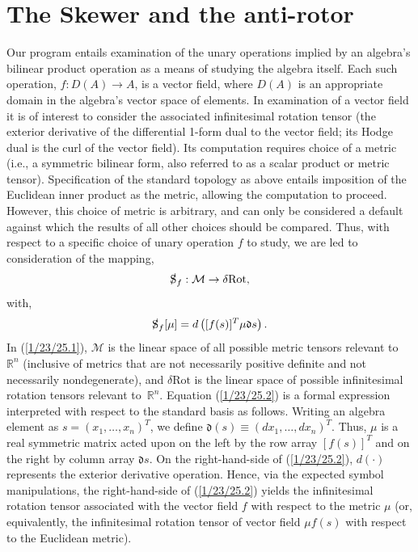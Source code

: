 \documentclass{amsart}
\numberwithin{equation}{section}
\theoremstyle{definition}
\numberwithin{theorem}{section}
\begin{document}
\section{The Skewer and the anti-rotor} 
Our program entails examination of the unary operations implied by an algebra's bilinear product operation as a means of studying the algebra itself.
Each such operation, $f:D(A)\rightarrow A$, is a vector field, where $D(A)$ is an appropriate domain in the algebra's vector space of elements.  In examination of a vector field it is of interest to consider the associated infinitesimal rotation tensor (the exterior derivative of the differential 1-form dual to the vector field; its Hodge dual is the curl of the vector field).  Its computation requires choice of a metric (i.e., a symmetric bilinear form, also referred to as a scalar product or metric tensor).  Specification of the standard topology as above entails imposition of the Euclidean inner product as the metric, allowing the computation to proceed.  However, this choice of metric is arbitrary, and can only be considered a default against which the results of all other choices should be compared.  Thus, with respect to a specific choice of unary operation $f$ to study, we are led to consideration of the mapping, \begin{equation}\label{1/23/25.1} \slashed{\text{S}}_f: \mathcal{M} \rightarrow \delta\text{Rot},\end{equation}  
with, \begin{equation}\label{1/23/25.2} \slashed{\text{S}}_f[\mu] = d\left([f(s)]^T \mu \mathfrak{d}s\right).  \end{equation}
 In (\ref{1/23/25.1}), $\mathcal{M}$ is the linear space of all possible metric tensors relevant to $\mathbb{R}^n$ (inclusive of metrics that are not necessarily positive definite and not necessarily nondegenerate), and $\delta\text{Rot}$ is the linear space of possible infinitesimal rotation tensors relevant \mbox{to $\mathbb{R}^n$}.  Equation (\ref{1/23/25.2}) is a formal expression interpreted with respect to the standard basis as follows.  Writing an algebra element as $s=(x_1,\dots,x_n)^T$, we define $\mathfrak{d}(s) \equiv (dx_1,\dots,dx_n)^T$. Thus, $\mu$ is a real symmetric matrix acted upon on the left by the row array $[f(s)]^T$ and on the right by column array $\mathfrak{d}s$.  On the right-hand-side of (\ref{1/23/25.2}), $d(\cdot)$ represents the exterior derivative operation.  Hence, via the expected symbol manipulations, the right-hand-side of (\ref{1/23/25.2}) yields the infinitesimal rotation tensor associated with the vector field $f$ with respect to the metric $\mu$ (or, equivalently, the infinitesimal rotation tensor of vector field $\mu f(s)$ with respect to the Euclidean metric).
\end{document}
